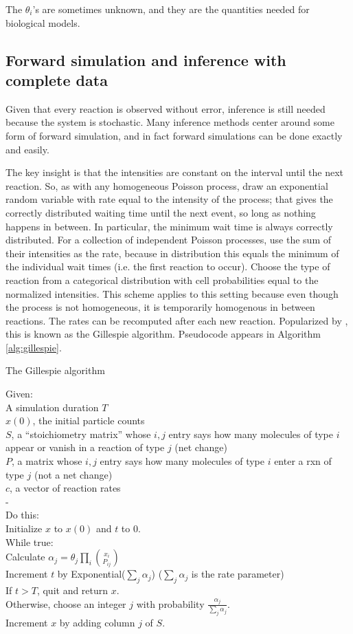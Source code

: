 \documentclass{article}
\begin{document}
The $\theta_{i}$'s are sometimes unknown, and they are the quantities needed for biological models.

\subsection{Forward simulation and inference with complete data}
Given that every reaction is observed without error, inference is still needed because the system is stochastic. Many inference methods center around some form of forward simulation, and in fact forward simulations can be done exactly and easily.

The key insight is that the intensities are constant on the interval until the next reaction. So, as with any homogeneous Poisson process, draw an exponential random variable with rate equal to the intensity of the process; that gives the correctly distributed waiting time until the next event, so long as nothing happens in between. In particular, the minimum wait time is always correctly distributed. For a collection of independent Poisson processes, use the sum of their intensities as the rate, because in distribution this equals the minimum of the individual wait times (i.e. the first reaction to occur). Choose the type of reaction from a categorical distribution with cell probabilities equal to the normalized intensities. This scheme applies to this setting because even though the process is not homogeneous, it is temporarily homogenous in between reactions. The rates can be recomputed after each new reaction. Popularized by  \cite{gillespie1977}, this is known as the Gillespie algorithm. Pseudocode appears in Algorithm \ref{alg:gillespie}.


\begin{algorithm}[h]
\caption{The Gillespie algorithm \label{alg:gillespie}}
Given:\\
\Indp
A simulation duration $T$\\
$x(0)$, the initial particle counts\\
$S$, a ``stoichiometry matrix'' whose $i,j$ entry says how many molecules of type $i$ appear or vanish in a reaction of type $j$ (net change)\\
$P$, a matrix whose $i,j$ entry says how many molecules of type $i$ enter a rxn of type $j$ (not a net change)\\
$c$, a vector of reaction rates\\
-\\
\Indm
Do this:\\
\Indp
Initialize $x$ to $x(0)$ and $t$ to 0.\\
While true:\\
\Indp
Calculate $\alpha_j = \theta_j\prod_i {x_i\choose P_{ij}}$\\
Increment $t$ by Exponential($\sum_j \alpha_j$) ($\sum_j \alpha_j$ is the rate parameter)\\
If $t > T$, quit and return $x$.\\
Otherwise, choose an integer $j$ with probability $\frac{\alpha_j}{\sum_j \alpha_j}$.\\
Increment $x$ by adding column $j$ of $S$.\\
\end{algorithm}
\end{document}
